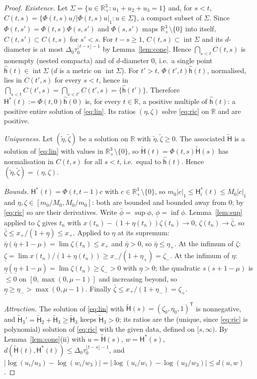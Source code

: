 \documentclass[11pt,a4paper]{article}
\numberwithin{equation}{section}
\theoremstyle{remark}\newtheorem{remark}[theorem]{Remark}
\newcommand{\R}{\mathbb R}
\DeclareMathOperator{\inter}{int}
\begin{document}
\begin{proof}
\emph{Existence.} Let $\Sigma=\{u\in\R^3_+:u_1+u_2+u_3=1\}$ and, for $s<t$,
$C(t,s)=\{\Phi(t,s)u/|\Phi(t,s)u|_1:u\in\Sigma\}$, a compact subset of $\Sigma$. Since
$\Phi(t,s')=\Phi(t,s)\Phi(s,s')$ and $\Phi(s,s')$ maps $\R^3_+\setminus\{0\}$ into itself, $C(t,s')\subset C(t,s)$
for $s'<s$. For $t-s\ge1$, $C(t,s)\subset\inter\Sigma$ and its $d$-diameter is at most
$\Delta_0\tau_0^{\lfloor t-s\rfloor-1}$ by Lemma~\ref{lem:cone}. Hence $\bigcap_{s<t}C(t,s)$ is nonempty (nested
compacta) and of $d$-diameter $0$, i.e.\ a single point $\hat{\mathsf h}(t)\in\inter\Sigma$ ($d$ is a metric on
$\inter\Sigma$). For $t'>t$, $\Phi(t',t)\hat{\mathsf h}(t)$, normalised, lies in $C(t',s)$ for every $s<t$, hence in
$\bigcap_{s<t}C(t',s)=\bigcap_{s<t'}C(t',s)=\{\hat{\mathsf h}(t')\}$. Therefore
$\mathsf H^*(t):=\Phi(t,0)\hat{\mathsf h}(0)$ is, for every $t\in\R$, a positive multiple of $\hat{\mathsf h}(t)$:
a positive entire solution of \eqref{eq:lin}. Its ratios $(\eta,\zeta)$ solve \eqref{eq:ric} on $\R$ and are
positive.

\emph{Uniqueness.} Let $(\tilde\eta,\tilde\zeta)$ be a solution on $\R$ with $\tilde\eta,\tilde\zeta\ge0$. The
associated $\tilde{\mathsf H}$ is a solution of \eqref{eq:lin} with values in $\R^3_+\setminus\{0\}$, so
$\tilde{\mathsf H}(t)=\Phi(t,s)\tilde{\mathsf H}(s)$ has normalisation in $C(t,s)$ for all $s<t$, i.e.\ equal to
$\hat{\mathsf h}(t)$. Hence $(\tilde\eta,\tilde\zeta)=(\eta,\zeta)$.

\emph{Bounds.} $\mathsf H^*(t)=\Phi(t,t-1)c$ with $c\in\R^3_+\setminus\{0\}$, so
$m_0|c|_1\le\mathsf H^*_i(t)\le M_0|c|_1$ and $\eta,\zeta\in[m_0/M_0,M_0/m_0]$: both are bounded and bounded away
from $0$; by \eqref{eq:ric} so are their derivatives. Write $\bar\phi=\sup\phi$, $\underline\phi=\inf\phi$.
Lemma~\ref{lem:sup} applied to $\zeta$ gives $t_n$ with $x(t_n)-(1+\eta(t_n))\zeta(t_n)\to0$, $\zeta(t_n)\to\bar\zeta$,
so $\bar\zeta\le x_+/(1+\underline\eta)\le x_+$. Applied to $\eta$ at its supremum:
$\bar\eta(\bar\eta+1-\mu)=\lim\zeta(t_n)\le x_+$ and $\bar\eta>0$, so $\bar\eta\le\eta_+$. At the infimum of
$\zeta$: $\underline\zeta=\lim x(t_n)/(1+\eta(t_n))\ge x_-/(1+\eta_+)=\zeta_-$. At the infimum of $\eta$:
$\underline\eta(\underline\eta+1-\mu)=\lim\zeta(t_n)\ge\zeta_->0$ with $\underline\eta>0$; the quadratic
$s(s+1-\mu)$ is $\le0$ on $[0,\max(0,\mu-1)]$ and increasing beyond, so $\underline\eta\ge\eta_->\max(0,\mu-1)$.
Finally $\bar\zeta\le x_+/(1+\eta_-)=\zeta_+$.

\emph{Attraction.} The solution of \eqref{eq:lin} with $\tilde{\mathsf H}(s)=(\zeta_0,\eta_0,1)^{\mathsf T}$ is
nonnegative, and $\tilde{\mathsf H}_3'=\tilde{\mathsf H}_2+\tilde{\mathsf H}_3\ge\tilde{\mathsf H}_3$ keeps
$\tilde{\mathsf H}_3>0$; its ratios are the (unique, since \eqref{eq:ric} is polynomial) solution of \eqref{eq:ric}
with the given data, defined on $[s,\infty)$. By Lemma~\ref{lem:cone}(ii) with $u=\tilde{\mathsf H}(s)$,
$w=\mathsf H^*(s)$, $d(\tilde{\mathsf H}(t),\mathsf H^*(t))\le\Delta_0\tau_0^{\lfloor t-s\rfloor-1}$, and
$|\log(u_i/u_3)-\log(w_i/w_3)|=|\log(u_i/w_i)-\log(u_3/w_3)|\le d(u,w)$.
\end{proof}
\end{document}
